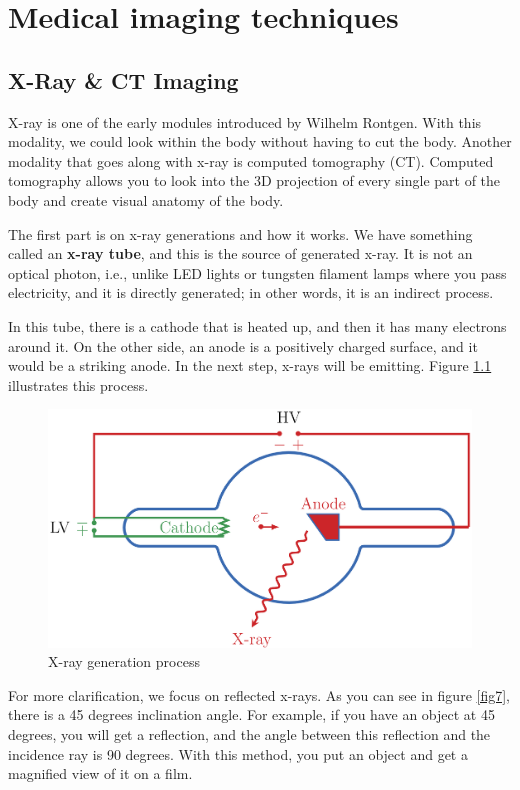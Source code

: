 \chapter{Medical imaging techniques}
\label{sec:chap3}

\section{X-Ray \& CT Imaging}
X-ray is one of the early modules introduced by Wilhelm Rontgen. With this modality, we could look within the body without having to cut the body. Another modality that goes along with x-ray is computed tomography (CT). Computed tomography allows you to look into the 3D projection of every single part of the body and create visual anatomy of the body.

The first part is on x-ray generations and how it works. We have something called an \textbf{x-ray tube}, and this is the source of generated x-ray. It is not an optical photon, i.e., unlike LED lights or tungsten filament lamps where you pass electricity, and it is directly generated; in other words, it is an indirect process.

In this tube, there is a cathode that is heated up, and then it has many electrons around it. On the other side, an anode is a positively charged surface, and it would be a striking anode. In the next step, x-rays will be emitting. Figure \ref{fig6} illustrates this process.  

\begin{figure}[h]
	\centering
	\includegraphics[width=0.7\columnwidth]{./figures/Fig6.png}
	\caption{X-ray generation process}
	\label{fig6}
\end{figure}

For more clarification, we focus on reflected x-rays. As you can see in figure \ref{fig7}, there is a 45 degrees inclination angle. For example, if you have an object at 45 degrees, you will get a reflection, and the angle between this reflection and the incidence ray is 90 degrees. With this method, you put an object and get a magnified view of it on a film.

